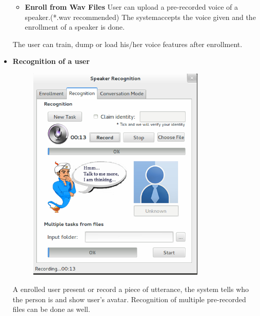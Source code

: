 \begin{itemize}
\begin{itemize}
      \item \textbf{Enroll from Wav Files}
        User can upload a pre-recorded voice of a speaker.(*.wav recommended)
        The systemaccepts the voice given and the enrollment of a speaker is done.
    \end{itemize}

    The user can train, dump or load his/her voice features after enrollment.

  \item \textbf{Recognition of a user} \\
    \begin{figure}[H]
      \centering
      \includegraphics[width=0.8\textwidth]{img/recognition.png}
    \end{figure}

    A enrolled user present or record a piece of utterance,
    the system tells who the person is and show user's avatar.
    Recognition of multiple pre-recorded files can be done as well.


\end{itemize}
